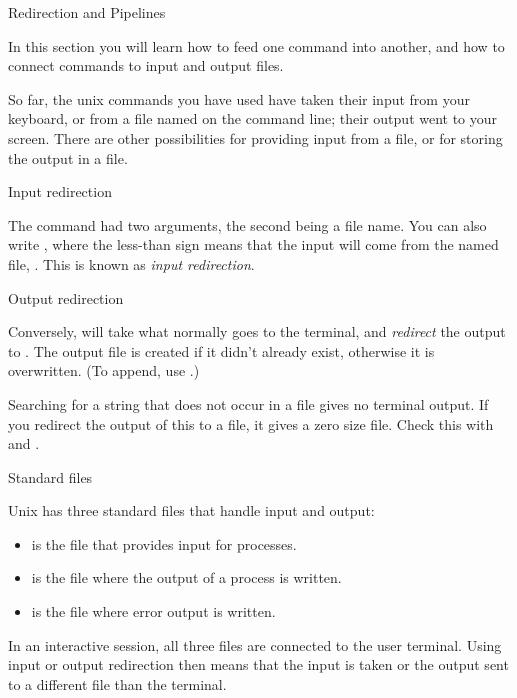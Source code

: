  {Redirection and Pipelines}
\label{sec:unixpipe}

\begin{purpose}
  In this section you will learn how to feed one command into another,
  and how to connect commands to input and output files.
\end{purpose}

So far, the unix commands you have used have taken their input from
your keyboard, or from a file named on the command line; their output
went to your screen. There are other possibilities for providing input
from a file, or for storing the output in a file.

 {Input redirection}

The  command had two arguments, the second being a file
name. You can also write , where the
less-than sign means that the input will come from the named file,
. This is known as \emph{input redirection}.

 {Output redirection}

Conversely,  will take what
normally goes to the terminal, and \emph{redirect}
the output to . The output
file is created if it didn't already exist, otherwise it is
overwritten. (To append, use .)

{Searching for a
  string that does not occur in a file gives no terminal output. If
  you redirect the output of this  to a file, it gives a zero size
  file. Check this with  and .}{}


 {Standard files}

Unix has three standard files that handle input and output:
\begin{itemize}
\item [{\tt stdin}\ ] is the file that provides input for processes.
\item [{\tt stdout}] is the file where the output of a process is
  written.
\item [{\tt stderr}] is the file where error output is written.
\end{itemize}
In an interactive session, all three files are connected to the user
terminal. Using input or output redirection then means that the input
is taken or the output sent to a different file than the terminal.

